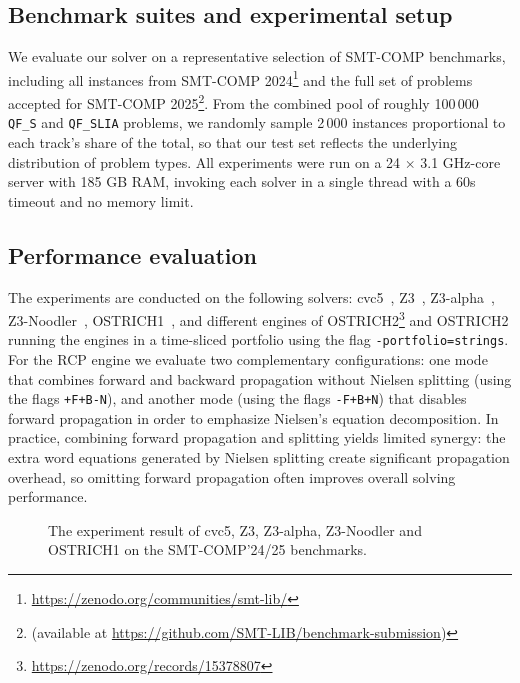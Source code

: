
\subsection{Benchmark suites and experimental setup}
We evaluate our solver on a representative selection of SMT-COMP benchmarks, including all instances from SMT-COMP 2024\footnote{\url{https://zenodo.org/communities/smt-lib/}} and the full set of problems accepted for SMT-COMP 2025\footnote{(available at \url{https://github.com/SMT-LIB/benchmark-submission})}.  From the combined pool of roughly 100\,000 \verb|QF_S| and \verb|QF_SLIA| problems, we randomly sample 2\,000 instances proportional to each track’s share of the total, so that our test set reflects the underlying distribution of problem types.
All experiments were run on a 24 $\times$ 3.1 GHz-core server with 185 GB RAM, invoking each solver in a single thread with a 60s timeout and no memory limit. 


\subsection{Performance evaluation}

The experiments are conducted on the following solvers: cvc5~\cite{cvc5}, Z3~\cite{z3}, Z3-alpha~\cite{z3alpha}, Z3-Noodler~\cite{noodler}, OSTRICH1~\cite{ostrich}, and different engines of OSTRICH2\footnote{\url{https://zenodo.org/records/15378807}} and OSTRICH2 running the engines in a time-sliced portfolio using the flag \texttt{-portfolio=strings}.
For the RCP engine we evaluate two complementary configurations: one mode that combines forward and backward propagation without Nielsen splitting (using the flags \texttt{+F+B-N}), and another mode (using the flags \texttt{-F+B+N}) that disables forward propagation in order to emphasize Nielsen's equation decomposition. 
In practice, combining forward propagation and splitting yields limited synergy: the extra word equations generated by Nielsen splitting create significant propagation overhead, so omitting forward propagation often improves overall solving performance.  

\begin{figure}[htbp]
  
  \caption{The experiment result of cvc5, Z3, Z3-alpha, Z3-Noodler and OSTRICH1 on the SMT-COMP'24/25 benchmarks.}
  \label{fig:experiment_res_z3_cvc5}
\end{figure}

